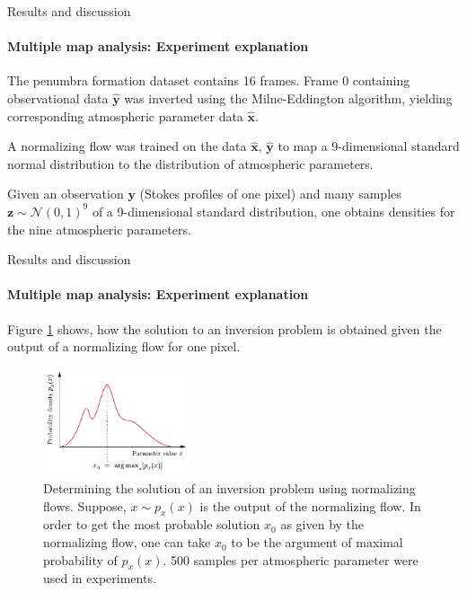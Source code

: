 \documentclass{beamer}
\newcommand\matr[1]{\ensuremath{\boldsymbol{\mathbf{#1}}}}
\newcommand\vect[1]{\ensuremath{\bm{#1}}}
\begin{document}
\begin{frame}[allowframebreaks]{Results and discussion}
\framesubtitle{Multiple map analysis: Experiment explanation} %
The penumbra formation dataset contains 16 frames. Frame 0 containing observational data $\hat{\matr{y}}$ was inverted using the Milne-Eddington algorithm, yielding corresponding atmospheric parameter data $\hat{\matr{x}}$.

A normalizing flow was trained on the data $\hat{\matr{x}}, \,\hat{\matr{y}}$ to map a 9-dimensional standard normal distribution to the distribution of atmospheric parameters.

Given an observation $\vect{y}$ (Stokes profiles of one pixel) and many samples $\vect{z} \sim \mathcal{N}(0,1)^9$ of a 9-dimensional standard distribution, one obtains densities for the nine atmospheric parameters.
\end{frame}


\begin{frame}[allowframebreaks]{Results and discussion}
\framesubtitle{Multiple map analysis: Experiment explanation} %
Figure \cref{fig:argmax} shows, how the solution to an inversion problem is obtained given the output of a normalizing flow for one pixel.

\begin{figure}[h!]
	\centering
	\includegraphics[width=4.3cm]{figures/thesis/argmax.pdf}
	\caption{Determining the solution of an inversion problem using normalizing flows. Suppose, $x \sim p_x(x)$ is the output of the normalizing flow. In order to get the most probable solution $x_0$ as given by the normalizing flow, one can take $x_0$ to be the argument of maximal probability of $p_x(x)$. 500 samples per atmospheric parameter were used in experiments.}
	\label{fig:argmax}
\end{figure}
\end{frame}
\end{document}

